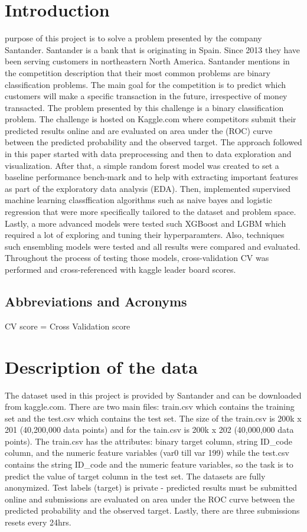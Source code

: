 \documentclass[journal,twoside,web]{ieeecolor}
\begin{document}
\section{Introduction}
\label{sec:introduction}
 purpose of this project is to solve a problem presented by the company Santander. Santander is a bank that is originating in Spain. Since 2013 they have been serving customers in northeastern North America. Santander mentions in the competition description that their most common problems are binary classification problems. The main goal for the competition is to predict which customers will make a specific transaction in the future, irrespective of money transacted. The problem presented by this challenge is a binary classification problem. The challenge is hosted on Kaggle.com where competitors submit their predicted results online and are evaluated on area under the (ROC) curve between the predicted probability and the observed target. The approach followed in this paper started with data preprocessing and then to data exploration and visualization. After that, a simple random forest model was created to set a baseline performance bench-mark and to help with extracting important features as part of the exploratory data analysis (EDA). Then, implemented supervised machine learning classffication algorithms such as naive bayes and logistic regression that were more specifically tailored to the dataset and problem space. Lastly, a more advanced models were tested such XGBoost and LGBM which required a lot of exploring and tuning their hyperparamters. Also, techniques such ensembling models were tested and all results were compared and evaluated. Throughout the process of testing those models, cross-validation CV was performed and cross-referenced with kaggle leader board scores.

\subsection{Abbreviations and Acronyms}
CV score = Cross Validation score \\

\section{Description of the data}
The dataset used in this project is provided by Santander and can be downloaded from kaggle.com. There are two main files: train.csv which contains the training set and the test.csv which contains the test set. The size of the train.csv is 200k x 201 (40,200,000 data points) and for the tain.csv is 200k x 202 (40,000,000 data points). The train.csv has the attributes: binary target column, string ID\_code column, and the numeric feature variables (var0 till var 199) while the test.csv contains the string ID\_code and the numeric feature variables, so the task is to predict the value of target column in the test set. The datasets are fully anonymized. Test labels (target) is private - predicted results must be submitted online and submissions are evaluated on area under the ROC curve between the predicted probability and the observed target. Lastly, there are three submissions resets every 24hrs.
\end{document}
